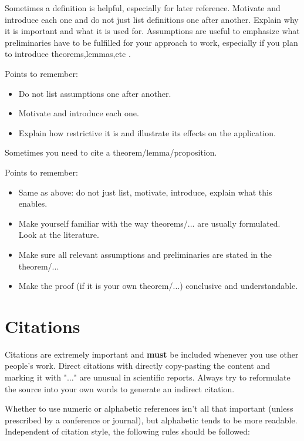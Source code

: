 Sometimes a definition is helpful, especially for later reference. Motivate and introduce each one and do not just list definitions one after another. Explain why it is important and what it is used for. Assumptions are useful to emphasize what preliminaries have to be fulfilled for your approach to work, especially if you plan to introduce theorems,lemmas,etc . 

Points to remember:
\begin{itemize}
	\item Do not list assumptions one after another. 
	\item Motivate and introduce each one.
	\item Explain how restrictive it is and illustrate its effects on the application.
\end{itemize}

Sometimes you need to cite a theorem/lemma/proposition. 

Points to remember:
\begin{itemize}
	\item Same as above: do not just list, motivate, introduce, explain what this enables.
	\item Make yourself familiar with the way theorems/... are usually formulated. Look at the literature. 
	\item Make sure all relevant assumptions and preliminaries are stated in the theorem/...
	\item Make the proof (if it is your own theorem/...) conclusive and understandable.
\end{itemize}



\section{Citations}

Citations are extremely important and \textbf{must} be included whenever you use other people's work. Direct citations with directly copy-pasting the content and marking it with "$\ldots$" are unusual in scientific reports. Always try to reformulate the source into your own words to generate an indirect citation. 


Whether to use numeric or alphabetic references isn't all that important (unless prescribed by a conference or journal), but alphabetic tends to be more readable. Independent of citation style, the following rules should be followed:

